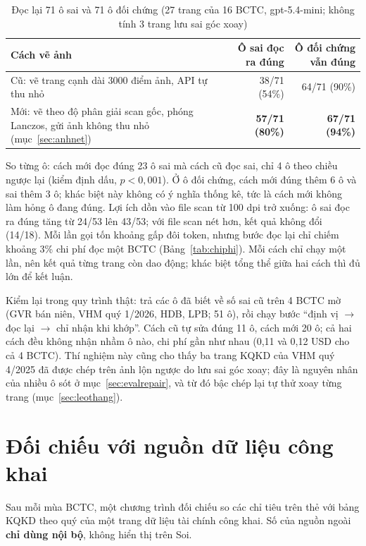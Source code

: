 \documentclass[12pt,a4paper]{report}
\newcommand{\enquote}[1]{“#1”}
\begin{document}
\begin{table}[H]
\centering\small
\caption{Đọc lại 71 ô sai và 71 ô đối chứng (27 trang của 16 BCTC, gpt-5.4-mini; không tính 3 trang lưu sai góc xoay)}\label{tab:anhnet}
\begin{tabularx}{\linewidth}{@{}>{\raggedright\arraybackslash}Xrr@{}}
\toprule
\textbf{Cách vẽ ảnh} & \textbf{Ô sai đọc ra đúng} & \textbf{Ô đối chứng vẫn đúng} \\ \midrule
Cũ: vẽ trang cạnh dài 3000 điểm ảnh, API tự thu nhỏ & 38/71 (54\%) & 64/71 (90\%) \\
Mới: vẽ theo độ phân giải scan gốc, phóng Lanczos, gửi ảnh không thu nhỏ (mục~\ref{sec:anhnet}) & \textbf{57/71 (80\%)} & \textbf{67/71 (94\%)} \\
\bottomrule
\end{tabularx}
\end{table}

So từng ô: cách mới đọc đúng 23 ô sai mà cách cũ đọc sai, chỉ 4 ô theo chiều ngược lại (kiểm định dấu, $p < 0{,}001$).
Ở ô đối chứng, cách mới đúng thêm 6 ô và sai thêm 3 ô; khác biệt này không có ý nghĩa thống kê, tức là cách mới không làm
hỏng ô đang đúng. Lợi ích dồn vào file scan từ 100 dpi trở xuống: ô sai đọc ra đúng tăng từ 24/53 lên 43/53; với file
scan nét hơn, kết quả không đổi (14/18). Mỗi lần gọi tốn khoảng gấp đôi token, nhưng bước đọc lại chỉ chiếm khoảng 3\%
chi phí đọc một BCTC (Bảng~\ref{tab:chiphi}). Mỗi cách chỉ chạy một lần, nên kết quả từng trang còn dao động; khác biệt
tổng thể giữa hai cách thì đủ lớn để kết luận.

Kiểm lại trong quy trình thật: trả các ô đã biết về số sai cũ trên 4 BCTC mờ (GVR bán niên, VHM quý 1/2026, HDB, LPB;
51 ô), rồi chạy bước \enquote{định vị $\rightarrow$ đọc lại $\rightarrow$ chỉ nhận khi khớp}. Cách cũ tự sửa đúng 11 ô,
cách mới 20 ô; cả hai cách đều không nhận nhầm ô nào, chi phí gần như nhau (0,11 và 0,12 USD cho cả 4 BCTC). Thí
nghiệm này cũng cho thấy ba trang KQKD của VHM quý 4/2025 đã được chép trên ảnh lộn ngược do lưu sai góc xoay; đây là
nguyên nhân của nhiều ô sót ở mục~\ref{sec:evalrepair}, và từ đó bậc chép lại tự thử xoay từng trang
(mục~\ref{sec:leothang}).

\section{Đối chiếu với nguồn dữ liệu công khai}\label{sec:doichieu}
Sau mỗi mùa BCTC, một chương trình đối chiếu so các chỉ tiêu trên thẻ với bảng KQKD theo quý của một trang dữ liệu
tài chính công khai. Số của nguồn ngoài \textbf{chỉ dùng nội bộ}, không hiển thị trên Soi.
\end{document}
